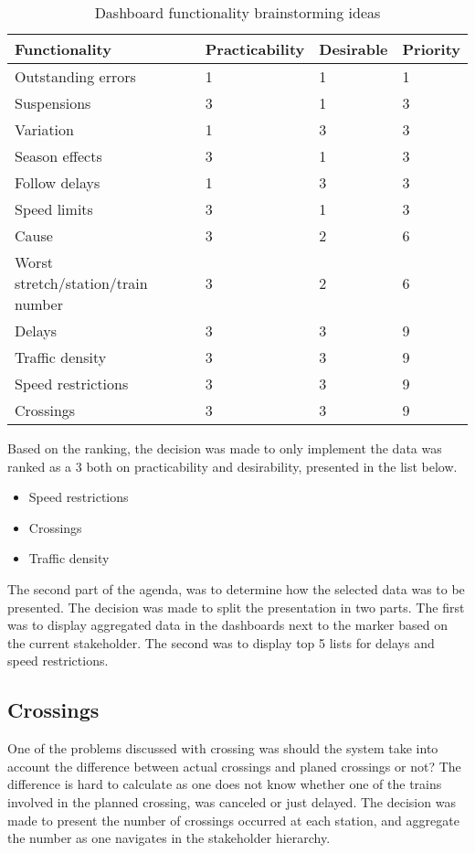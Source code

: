 \begin{table}[!h]\small
	\begin{tabularx}{\textwidth}{|X|l|l|l|}
		\hline
		Functionality & Practicability & Desirable & Priority\\
		\hline
		Outstanding errors & 1 & 1 & 1\\
		\hline
		Suspensions & 3 & 1 & 3\\
		\hline
		Variation & 1 & 3 & 3\\
		\hline
		Season effects & 3 & 1 & 3\\
		\hline
		Follow delays & 1 & 3 & 3\\
		\hline
		Speed limits & 3 & 1 & 3\\
		\hline
		Cause & 3 & 2 & 6\\
		\hline
	 	Worst stretch/station/train number & 3 & 2 & 6\\
		\hline
		Delays & 3 & 3 & 9\\
		\hline
		Traffic density & 3 & 3 & 9\\
		\hline
		Speed restrictions & 3 & 3 & 9\\
		\hline
		Crossings & 3 & 3 & 9\\
		\hline
	\end{tabularx}
\caption{Dashboard functionality brainstorming ideas}
\label{table:dashboard_functionality_wants_vs_needs}
\end{table}

Based on the ranking, the decision was made to only implement the data was
ranked as a 3 both on practicability and desirability, presented in the list
below.

\begin{itemize}
  \item Speed restrictions
  \item Crossings
  \item Traffic density
\end{itemize}

The second part of the agenda, was to determine how the selected data was to be
presented. The decision was made to split the presentation in two parts. The
first was to display aggregated data in the dashboards next to the marker based
on the current stakeholder. The second was to display top 5 lists for delays
and speed restrictions.

\subsection{Crossings} %
\label{sub:crossings}
One of the problems discussed with crossing was should the system take into 
account the difference between actual crossings and planed crossings or not? 
The difference is hard to calculate as one does not know whether one of the 
trains involved in the planned crossing, was canceled or just delayed. The 
decision was made to present the number of crossings occurred at each station, 
and aggregate the number as one navigates in the stakeholder hierarchy.

